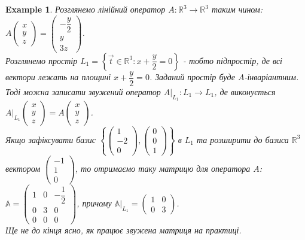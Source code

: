 \documentclass[a4paper, 10pt]{article}
\theoremstyle{theoremdd}
\newtheorem{example}[theorem]{Example}
\begin{document}
\iffalse
\begin{example}
Розглянемо лінійний оператор $A: \mathbb{R}^3 \to \mathbb{R}^3$ таким чином:\\
$A \begin{pmatrix}
x \\ y \\ z
\end{pmatrix} = \begin{pmatrix}
-\dfrac{y}{2} \\ y \\ 3z
\end{pmatrix}$.\\
Розглянемо простір $L_1 = \left\{ \vec{t} \in \mathbb{R}^3 : x + \dfrac{y}{2} = 0 \right\}$ - тобто підпростір, де всі вектори лежать на площині $x + \dfrac{y}{2} = 0$. Заданий простір буде $A$-інваріантним.\\
Тоді можна записати звужений оператор $A|_{L_1}: L_1 \to L_1$, де виконується $A|_{L_1} \begin{pmatrix}
x \\ y \\ z
\end{pmatrix} = A\begin{pmatrix}
x \\ y \\ z
\end{pmatrix}$.\\
Якщо зафіксувати базис $\left\{ \begin{pmatrix}
1 \\ -2 \\ 0
\end{pmatrix}, \begin{pmatrix}
0 \\ 0 \\ 1
\end{pmatrix} \right\}$ в $L_1$ та розширити до базиса $\mathbb{R}^3$ вектором $\begin{pmatrix}
-1 \\ 1 \\ 0
\end{pmatrix}$, то отримаємо таку матрицю для оператора $A$:\\
$\mathbb{A} = \begin{pmatrix}
1 & 0 & -\dfrac{1}{2} \\
0 & 3 & 0 \\
0 & 0 & 0
\end{pmatrix}$, причому $\mathbb{A}|_{L_1} = \begin{pmatrix}
1 & 0 \\
0 & 3
\end{pmatrix}$.\\
\textit{Ще не до кінця ясно, як працює звужена матриця на практиці.}
\end{example}
\end{document}
